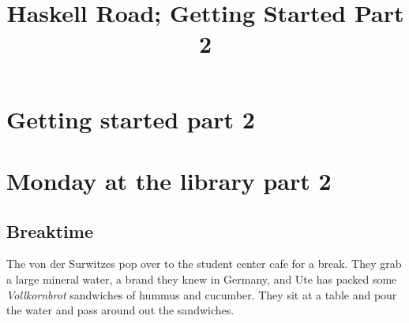 \documentclass[american]{article}
\date{}
\title{Haskell Road; Getting Started Part 2}
\begin{document}
\maketitle

\section*{Getting started part 2}
\label{sec:org7bfc1b4}


\section*{Monday at the library part 2}
\label{sec:org71987b3}

\subsection*{Breaktime}
\label{sec:org4fec33f}

The von der Surwitzes pop over to the student center cafe for a break.
They grab a large mineral water, a brand they knew in Germany, and Ute
has packed some \emph{Vollkornbrot} sandwiches of hummus and cucumber. They
sit at a table and pour the water and pass around out the sandwiches.
\end{document}
